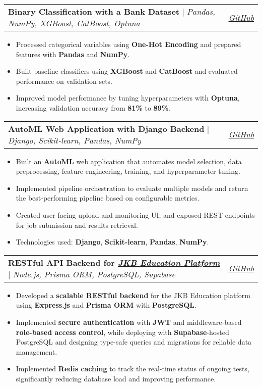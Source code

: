 \documentclass[letterpaper,11pt]{article}
\makeatletter
\newcommand{\resumeItem}[1]{
  \item\small{
    {#1 \vspace{-2pt}}
  }
}
\newcommand{\resumeProjectHeading}[2]{
    \item
    \begin{tabular*}{0.97\textwidth}{l@{\extracolsep{\fill}}r}
      \small#1 & #2 \\
    \end{tabular*}\vspace{-7pt}
}
\newcommand{\resumeItemListStart}{\begin{itemize}}
\newcommand{\resumeItemListEnd}{\end{itemize}\vspace{-5pt}}
\makeatother
\begin{document}
\resumeProjectHeading
  {\textbf{Binary Classification with a Bank Dataset} $|$ \emph{Pandas, NumPy, XGBoost, CatBoost, Optuna}}{\href{https://github.com/Aum-Patel1234/Machine-Learning/tree/master/Binary_Classification_with_a_Bank_Dataset}{\textit{\color{blue}GitHub}}}
  \resumeItemListStart
    \resumeItem{Processed categorical variables using \textbf{One-Hot Encoding} and prepared features with \textbf{Pandas} and \textbf{NumPy}.}
    \resumeItem{Built baseline classifiers using \textbf{XGBoost} and \textbf{CatBoost} and evaluated performance on validation sets.}
    \resumeItem{Improved model performance by tuning hyperparameters with \textbf{Optuna}, increasing validation accuracy from \textbf{81\%} to \textbf{89\%}.}
  \resumeItemListEnd

  \resumeProjectHeading
    {\textbf{AutoML Web Application with Django Backend} $|$ \emph{Django, Scikit-learn, Pandas, NumPy}}{\href{https://github.com/Aum-Patel1234/Auto-ML}{\textit{\color{blue}GitHub}}}
    \resumeItemListStart
      \resumeItem{Built an \textbf{AutoML} web application that automates model selection, data preprocessing, feature engineering, training, and hyperparameter tuning.}
      \resumeItem{Implemented pipeline orchestration to evaluate multiple models and return the best-performing pipeline based on configurable metrics.}
      \resumeItem{Created user-facing upload and monitoring UI, and exposed REST endpoints for job submission and results retrieval.}
      \resumeItem{Technologies used: \textbf{Django}, \textbf{Scikit-learn}, \textbf{Pandas}, \textbf{NumPy}.}
    \resumeItemListEnd

\resumeProjectHeading
  {\textbf{RESTful API Backend for \href{https://jkbeducation.com/}{\color{black}\textit{JKB Education Platform}}} 
  $|$ \emph{Node.js, Prisma ORM, PostgreSQL, Supabase}}{\href{https://github.com/Swaraj2004/jkb-backend}{\textit{\color{blue}GitHub}}}
  \resumeItemListStart
    \resumeItem{Developed a \textbf{scalable RESTful backend} for the JKB Education platform using \textbf{Express.js} and \textbf{Prisma ORM} with \textbf{PostgreSQL}.}
    \resumeItem{Implemented \textbf{secure authentication} with \textbf{JWT} and middleware-based \textbf{role-based access control}, while deploying with \textbf{Supabase}-hosted PostgreSQL and designing type-safe queries and migrations for reliable data management.}
   \resumeItem{Implemented \textbf{Redis caching} to track the real-time status of ongoing tests, significantly reducing database load and improving performance.}

  \resumeItemListEnd
\end{document}
